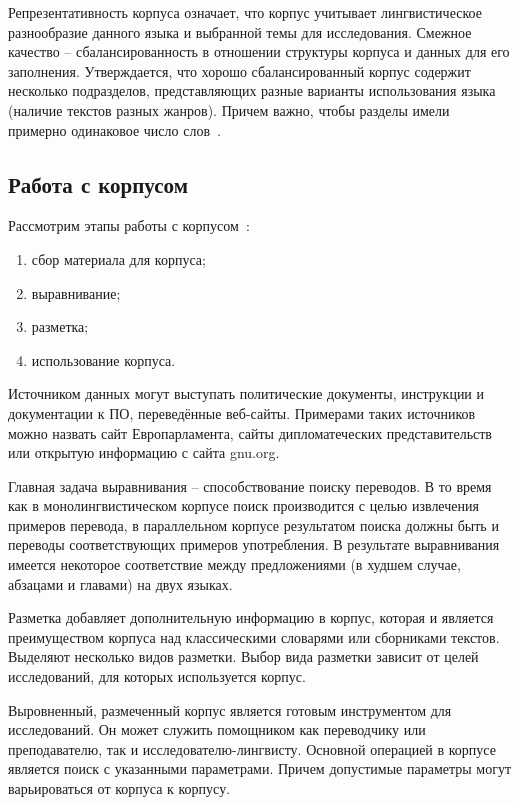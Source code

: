 Репрезентативность корпуса означает, что корпус учитывает лингвистическое разнообразие данного языка и выбранной темы для исследования. 
Смежное качество -- сбалансированность в отношении структуры корпуса и данных для его заполнения. 
Утверждается, что хорошо сбалансированный корпус содержит несколько подразделов, представляющих разные варианты использования языка (наличие текстов разных жанров). 
Причем важно, чтобы разделы имели примерно одинаковое число слов~\cite{szudarski-corpus-linguistics-for-vocab-2017}.

\subsection{Работа с корпусом}

Рассмотрим этапы работы с корпусом~\cite{spyns-theory-and-applications-NLP-2013}:

\begin{enumerate}
	\item сбор материала для корпуса;
	
	\item выравнивание;
	
	\item разметка;
	
	\item использование корпуса.
\end{enumerate}

Источником данных могут выступать политические документы, инструкции и документации к ПО, переведённые веб-сайты. 
Примерами таких источников можно назвать сайт Европарламента, сайты дипломатеческих представительств или открытую информацию с сайта gnu.org.

Главная задача выравнивания -- способствование поиску переводов. 
В то время как в монолингвистическом корпусе поиск производится с целью извлечения примеров перевода, в параллельном корпусе результатом поиска должны быть и переводы соответствующих примеров употребления. 
В результате выравнивания имеется некоторое соответствие между предложениями (в худшем случае, абзацами и главами) на двух языках.

Разметка добавляет дополнительную информацию в корпус, которая и является преимуществом корпуса над классическими словарями или сборниками текстов. Выделяют несколько видов разметки. Выбор вида разметки зависит от целей исследований, для которых используется корпус.

Выровненный, размеченный корпус является готовым инструментом для исследований. 
Он может служить помощником как переводчику или преподавателю, так и исследователю-лингвисту. 
Основной операцией в корпусе является поиск с указанными параметрами. 
Причем допустимые параметры могут варьироваться от корпуса к корпусу.

